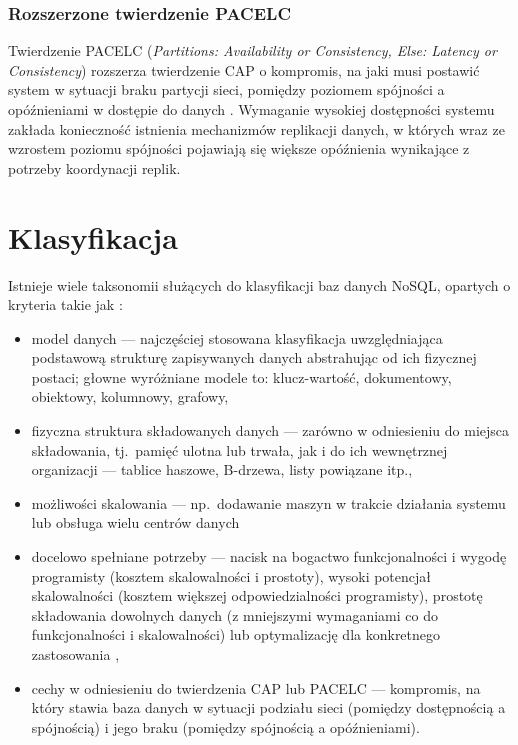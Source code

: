 \subsubsection*{Rozszerzone twierdzenie PACELC}

Twierdzenie PACELC (\textit{Partitions: Availability or Consistency, Else: Latency or Consistency}) rozszerza twierdzenie CAP o kompromis, na jaki musi postawić system w sytuacji braku partycji sieci, pomiędzy poziomem spójności a opóźnieniami w dostępie do danych \cite{abadi-pacelc}. Wymaganie wysokiej dostępności systemu zakłada konieczność istnienia mechanizmów replikacji danych, w których wraz ze wzrostem poziomu spójności pojawiają się większe opóźnienia wynikające z potrzeby koordynacji replik.

\section{Klasyfikacja}

Istnieje wiele taksonomii służących do klasyfikacji baz danych NoSQL, opartych o kryteria takie jak \cite{nosql}:
\begin{itemize}
    \item model danych --- najczęściej stosowana klasyfikacja uwzględniająca podstawową strukturę zapisywanych danych abstrahując od ich fizycznej postaci; głowne wyróżniane modele to: klucz-wartość, dokumentowy, obiektowy, kolumnowy, grafowy,
    \item fizyczna struktura składowanych danych --- zarówno w odniesieniu do miejsca składowania,
        tj.\ pamięć ulotna lub trwała, jak i do ich wewnętrznej organizacji --- tablice haszowe, B-drzewa, listy powiązane itp.,
    \item możliwości skalowania --- np.\ dodawanie maszyn w trakcie działania systemu lub obsługa wielu centrów danych \cite{ell09a}
    \item docelowo spełniane potrzeby --- nacisk na bogactwo funkcjonalności i wygodę programisty (kosztem skalowalności i prostoty), wysoki potencjał skalowalności (kosztem większej odpowiedzialności programisty), prostotę składowania dowolnych danych (z mniejszymi wymaganiami co do funkcjonalności i skalowalności) lub optymalizację dla konkretnego zastosowania \cite{ham09},
    \item cechy w odniesieniu do twierdzenia CAP lub PACELC --- kompromis, na który stawia baza
        danych w sytuacji podziału sieci (pomiędzy dostępnością a spójnością) i jego braku (pomiędzy spójnością a opóźnieniami).
\end{itemize}


